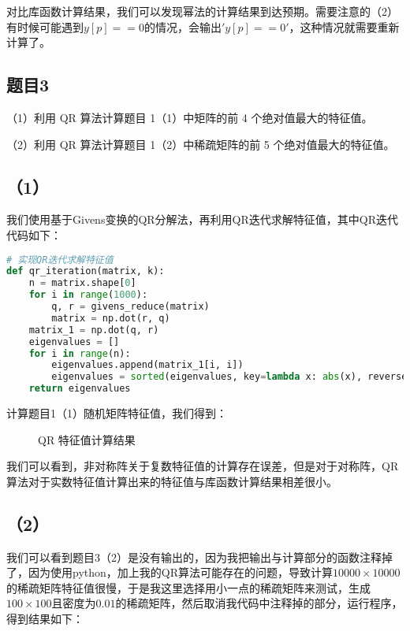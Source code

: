 \documentclass{source/Report}
\begin{document}
对比库函数计算结果，我们可以发现幂法的计算结果到达预期。需要注意的（2）有时候可能遇到$y[p] == 0$的情况，会输出$'y[p] == 0'$，这种情况就需要重新计算了。

\subsection{题目3}

（1）利用 QR 算法计算题目 1（1）中矩阵的前 4 个绝对值最大的特征值。

（2）利用 QR 算法计算题目 1（2）中稀疏矩阵的前 5 个绝对值最大的特征值。\\ \par

\subsection*{（1）}
我们使用基于Givens变换的QR分解法，再利用QR迭代求解特征值，其中QR迭代代码如下：

\begin{lstlisting}[language = Python, title = {QR Iteration 代码}]
# 实现QR迭代求解特征值
def qr_iteration(matrix, k):
    n = matrix.shape[0]
    for i in range(1000):
        q, r = givens_reduce(matrix)
        matrix = np.dot(r, q)
    matrix_1 = np.dot(q, r)
    eigenvalues = []
    for i in range(n):
        eigenvalues.append(matrix_1[i, i])
        eigenvalues = sorted(eigenvalues, key=lambda x: abs(x), reverse=True)[:k]
    return eigenvalues
\end{lstlisting} 

计算题目1（1）随机矩阵特征值，我们得到：
\begin{figure}[htbp]
  \centering
  \label{fig:subfig}
  \caption{QR 特征值计算结果}
\end{figure}

我们可以看到，非对称阵关于复数特征值的计算存在误差，但是对于对称阵，QR算法对于实数特征值计算出来的特征值与库函数计算结果相差很小。
\subsection*{（2）}

我们可以看到题目3（2）是没有输出的，因为我把输出与计算部分的函数注释掉了，因为使用python，加上我的QR算法可能存在的问题，导致计算$10000\times 10000$的稀疏矩阵特征值很慢，于是我这里选择用小一点的稀疏矩阵来测试，生成$100\times 100$且密度为$0.01$的稀疏矩阵，然后取消我代码中注释掉的部分，运行程序，得到结果如下：
\end{document}
